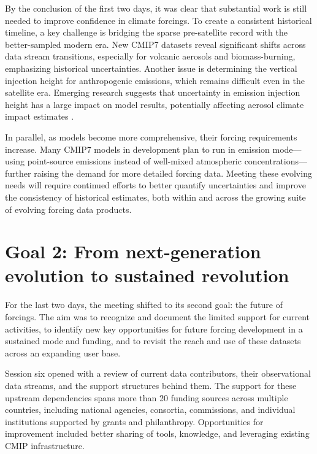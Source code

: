 \documentclass{ametsocV6.1}
\begin{document}
By the conclusion of the first two days, it was clear that substantial work is still needed to improve confidence in climate forcings. To create a consistent historical timeline, a key challenge is bridging the sparse pre-satellite record with the better-sampled modern era. New CMIP7 datasets reveal significant shifts across data stream transitions, especially for volcanic aerosols and biomass-burning, emphasizing historical uncertainties. Another issue is determining the vertical injection height for anthropogenic emissions, which remains difficult even in the satellite era. Emerging research suggests that uncertainty in emission injection height has a large impact on model results, potentially affecting aerosol climate impact estimates \citep[e.g.,][]{ahsan_emissions_2023}.

In parallel, as models become more comprehensive, their forcing requirements increase. Many CMIP7 models in development plan to run in emission mode—using point-source emissions instead of well-mixed atmospheric concentrations—further raising the demand for more detailed forcing data. Meeting these evolving needs will require continued efforts to better quantify uncertainties and improve the consistency of historical estimates, both within and across the growing suite of evolving forcing data products.

\section*{Goal 2: From next-generation evolution to sustained revolution}
For the last two days, the meeting shifted to its second goal: the future of forcings. The aim was to recognize and document the limited support for current activities, to identify new key opportunities for future forcing development in a sustained mode and funding, and to revisit the reach and use of these datasets across an expanding user base.

Session six opened with a review of current data contributors, their observational data streams, and the support structures behind them. The support for these upstream dependencies spans more than 20 funding sources across multiple countries, including national agencies, consortia, commissions, and individual institutions supported by grants and philanthropy. Opportunities for improvement included better sharing of tools, knowledge, and leveraging existing CMIP infrastructure.
\end{document}
